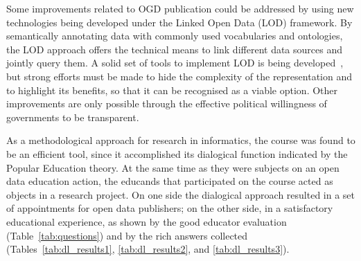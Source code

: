 


Some improvements related to OGD publication could be addressed by using new technologies being developed under the Linked Open Data (LOD) framework. By semantically annotating data with commonly used vocabularies and ontologies, the LOD approach offers the technical means to link different data sources and jointly query them. A solid set of tools to implement LOD is being developed~\cite{Auer2014}, but strong efforts must be made to hide the complexity of the representation and to highlight its benefits, so that it can be recognised as a viable option. Other improvements are only possible through the effective political willingness of governments to be transparent.

As a methodological approach for research in informatics, the course was found to be an efficient tool, since it accomplished its dialogical function indicated by the Popular Education theory. At the same time as they were subjects on an open data education action, the educands that participated on the course acted as objects in a research project. On one side the dialogical approach resulted in a set of appointments for open data publishers; on the other side, in a satisfactory educational experience, as shown by the good educator evaluation (Table~\ref{tab:questions}) and by the rich answers collected (Tables~\ref{tab:dl_results1}, \ref{tab:dl_results2}, and \ref{tab:dl_results3}).


